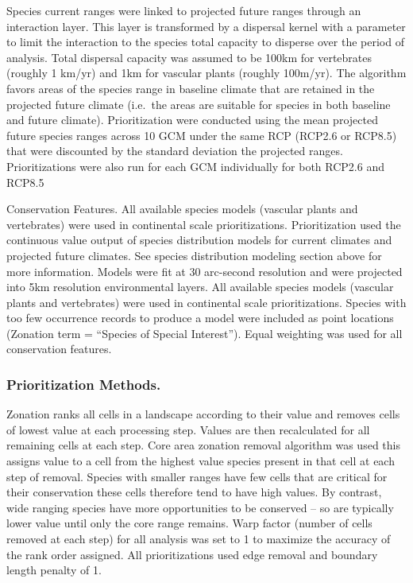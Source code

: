 \documentclass[]{article}
\begin{document}
Species current ranges were linked to projected future ranges through an interaction layer. This layer is transformed by a dispersal kernel with a parameter to limit the interaction to the species total capacity to disperse over the period of analysis. Total dispersal capacity was assumed to be 100km for vertebrates (roughly 1 km/yr) and 1km for vascular plants (roughly 100m/yr). The algorithm favors areas of the species range in baseline climate that are retained in the projected future climate (i.e.~the areas are suitable for species in both baseline and future climate). Prioritization were conducted using the mean projected future species ranges across 10 GCM under the same RCP (RCP2.6 or RCP8.5) that were discounted by the standard deviation the projected ranges. Prioritizations were also run for each GCM individually for both RCP2.6 and RCP8.5

Conservation Features. All available species models (vascular plants and vertebrates) were used in continental scale prioritizations. Prioritization used the continuous value output of species distribution models for current climates and projected future climates. See species distribution modeling section above for more information. Models were fit at 30 arc-second resolution and were projected into 5km resolution environmental layers. All available species models (vascular plants and vertebrates) were used in continental scale prioritizations. Species with too few occurrence records to produce a model were included as point locations (Zonation term = ``Species of Special Interest''). Equal weighting was used for all conservation features.

\hypertarget{prioritization-methods.}{%
\subsubsection{Prioritization Methods.}\label{prioritization-methods.}}

Zonation ranks all cells in a landscape according to their value and removes cells of lowest value at each processing step. Values are then recalculated for all remaining cells at each step. Core area zonation removal algorithm was used this assigns value to a cell from the highest value species present in that cell at each step of removal. Species with smaller ranges have few cells that are critical for their conservation these cells therefore tend to have high values. By contrast, wide ranging species have more opportunities to be conserved -- so are typically lower value until only the core range remains. Warp factor (number of cells removed at each step) for all analysis was set to 1 to maximize the accuracy of the rank order assigned. All prioritizations used edge removal and boundary length penalty of 1.
\end{document}
